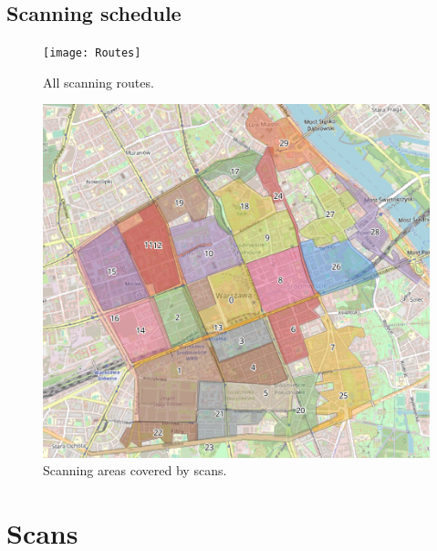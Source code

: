 \documentclass[a4paper,12pt]{book}
\begin{document}
\section{Scanning schedule}
\begin{figure}[H]
	\centering
	\texttt{[image: Routes]}
	\caption{All scanning routes.}
\end{figure}

\begin{figure}[H]
	\centering
	\includegraphics[width=1\linewidth]{Scan_zones}
	\caption{Scanning areas covered by scans.}
\end{figure}



\chapter{Scans}
\end{document}
